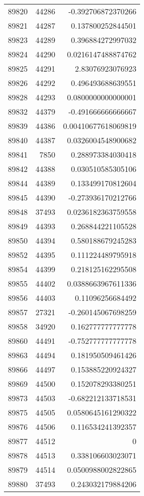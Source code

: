 \begin{tabular}{r | r | r}
89820 & 44286 & -0.392706872370266 \\
89821 & 44287 & 0.137800252844501 \\
89823 & 44289 & 0.396884272997032 \\
89824 & 44290 & 0.0216147488874762 \\
89825 & 44291 & 2.83076923076923 \\
89826 & 44292 & 0.496493688639551 \\
89828 & 44293 & 0.0800000000000001 \\
89832 & 44379 & -0.491666666666667 \\
89839 & 44386 & 0.00410677618069819 \\
89840 & 44387 & 0.0326004548900682 \\
89841 & 7850 & 0.288973384030418 \\
89842 & 44388 & 0.030510585305106 \\
89844 & 44389 & 0.133499170812604 \\
89845 & 44390 & -0.273936170212766 \\
89848 & 37493 & 0.0236182363759558 \\
89849 & 44393 & 0.268844221105528 \\
89850 & 44394 & 0.580188679245283 \\
89852 & 44395 & 0.111224489795918 \\
89854 & 44399 & 0.218125162295508 \\
89855 & 44402 & 0.0388663967611336 \\
89856 & 44403 & 0.11096256684492 \\
89857 & 27321 & -0.260145067698259 \\
89858 & 34920 & 0.162777777777778 \\
89860 & 44491 & -0.752777777777778 \\
89863 & 44494 & 0.181950509461426 \\
89866 & 44497 & 0.153885220924327 \\
89869 & 44500 & 0.152078293380251 \\
89873 & 44503 & -0.682212133718531 \\
89875 & 44505 & 0.0580645161290322 \\
89876 & 44506 & 0.116534241392357 \\
89877 & 44512 & 0 \\
89878 & 44513 & 0.338106603023071 \\
89879 & 44514 & 0.0500988002822865 \\
89880 & 37493 & 0.243032179884206 \\

\end{tabular}
